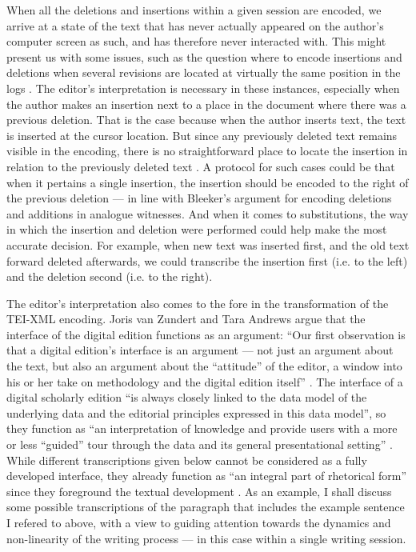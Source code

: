 \begin{paper}
When all the deletions and insertions within a given session are
encoded, we arrive at a state of the text that has never actually
appeared on the author's computer screen as such, and has therefore never
interacted with. This might present us with some issues, such as the question where
to encode insertions and deletions  when several
revisions are located at virtually the same position in the logs \citep[34]{kollberg_s-notation_1998}.
The editor's interpretation is necessary in these instances, especially when the author makes an
insertion next to a place in the document where there was a previous deletion. That is the case because when the author inserts text, the text is inserted at the cursor location. But since any
previously deleted text remains visible in the encoding, there is no straightforward place to locate the insertion in relation to the previously deleted text \citep[34]{kollberg_s-notation_1998}. A protocol for such cases could be that when  it pertains a single insertion, the insertion should be encoded to the right of the previous deletion --- in line with Bleeker's argument for encoding deletions and additions in analogue witnesses. And when it comes to
substitutions, the way in which the insertion and deletion were performed could help make the most accurate decision. For example, when new text was inserted first, and the old text forward deleted afterwards, we could transcribe the insertion first (i.e. to the left) and the deletion second (i.e. to the right).

The editor's interpretation also comes to the fore in the transformation
of the TEI-XML encoding. Joris van
Zundert and Tara Andrews argue that the interface of the digital edition
functions as an argument: ``Our first observation is that a digital
edition's interface is an argument --- not just an argument about the
text, but also an argument about the ``attitude'' of the editor, a window
into his or her take on methodology and the digital edition itself''
\citeyearpar[7]{andrews_what_2018}. The interface of a digital scholarly edition ``is always
closely linked to the data model of the underlying data and the
editorial principles expressed in this data model'', so they function as
``an interpretation of knowledge and provide users with a more or less
``guided'' tour through the data and its general presentational setting'' \citep[VII]{bleier_discussing_2018}. While different transcriptions given below
cannot be considered as a fully developed interface, they already
function as ``an integral part of rhetorical form'' since they
foreground the textual development \citep[8]{andrews_what_2018}. As an example, I
shall discuss some possible transcriptions of the paragraph that includes
the example sentence I refered to above, with a view to guiding attention towards
the dynamics and non-linearity of the writing process --- in this case
within a single writing session.


\end{paper}
